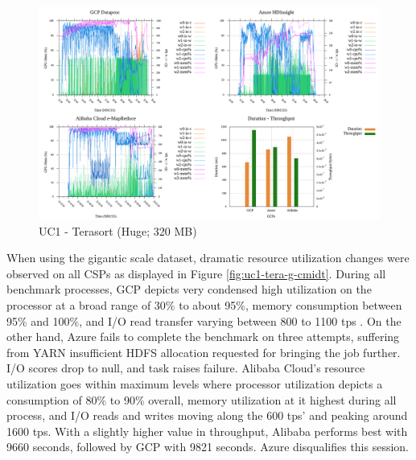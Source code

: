 \documentclass[review]{elsarticle}
\begin{document}
\begin{figure}[p]
	\caption{UC1 - Terasort (Huge; 320 MB)}
	\label{fig:uc1-tera-h-cmidt}
	\includegraphics[width=\textwidth]{uc1-tera-h-cmidt}
	\centering
\end{figure}

When using the gigantic scale dataset, dramatic resource utilization changes were observed on all CSPs as displayed in Figure \ref{fig:uc1-tera-g-cmidt}. During all benchmark processes, GCP depicts very condensed high utilization on the processor at a broad range of 30\% to about 95\%, memory consumption between 95\% and 100\%, and I/O read transfer varying between 800 to 1100 tps . On the other hand, Azure fails to complete the benchmark on three attempts, suffering from YARN insufficient HDFS allocation requested for bringing the job further. I/O scores drop to null, and task raises failure. Alibaba Cloud's resource utilization goes within maximum levels where processor utilization depicts a consumption of 80\% to 90\% overall, memory utilization at it highest during all process, and I/O reads and writes moving along the 600 tps' and peaking around 1600 tps. With a slightly higher value in throughput, Alibaba performs best with 9660 seconds, followed by GCP with 9821 seconds. Azure disqualifies this session. 
\end{document}
